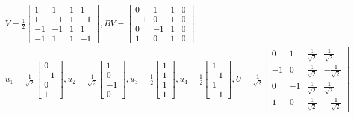 \documentclass{article}
\begin{document}
	\begin{gather*}
	V=\frac{1}{2}\begin{bmatrix}
	1 & 1 & 1 & 1 \\
	1 & -1 & 1 & -1\\
	-1 & -1 & 1 & 1\\
	-1 & 1 & 1 & -1
	\end{bmatrix},
	BV=\begin{bmatrix}
	0 & 1 & 1 & 0\\
	-1 & 0 & 1 & 0\\
	0 & -1 & 1 & 0\\
	1 & 0 & 1 & 0
	\end{bmatrix}\\
	u_{1}=\frac{1}{\sqrt{2}}\begin{bmatrix}
	0\\
	-1\\
	0\\
	1
	\end{bmatrix},
	u_{2}=\frac{1}{\sqrt{2}}\begin{bmatrix}
	1\\
	0\\
	-1\\
	0
	\end{bmatrix},
	u_{3}=\frac{1}{2}\begin{bmatrix}
	1\\
	1\\
	1\\
	1
	\end{bmatrix},
	u_{4}=\frac{1}{2}\begin{bmatrix}
	1\\
	-1\\
	1\\
	-1
	\end{bmatrix},
	U=\frac{1}{\sqrt{2}}\begin{bmatrix}
	0 & 1 & \frac{1}{\sqrt{2}} & \frac{1}{\sqrt{2}} \\
	-1 & 0 & \frac{1}{\sqrt{2}} & -\frac{1}{\sqrt{2}} \\
	0 & -1 & \frac{1}{\sqrt{2}} & \frac{1}{\sqrt{2}} \\
	1 & 0 & \frac{1}{\sqrt{2}} & -\frac{1}{\sqrt{2}}
	\end{bmatrix}
	\end{gather*}
\end{document}
